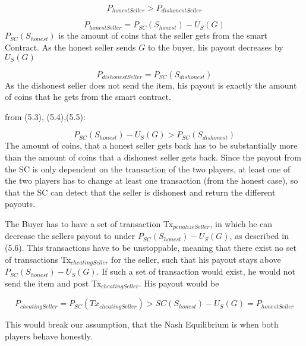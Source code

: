 \documentclass{cacthesis}
\begin{document}
\begin{equation}
    P_{honestSeller} > P_{dishonestSeller}
\end{equation}

\begin{equation}
    P_{honestSeller} = P_{SC}(S_{honest})- U_S(G)
\end{equation}
$P_{SC}(S_{honest})$ is the amount of coins that the seller gets from the smart Contract. As the honest seller sends $G$ to the buyer, his payout decreases by $U_S(G)$

\begin{equation}
    P_{dishonestSeller} = P_{SC}(S_{dishonest})
\end{equation}
As the dishonest seller does not send the item, his payout is exactly the amount of coins that he gets from the smart contract.

from (5.3), (5.4),(5.5):

\begin{equation}
   P_{SC}(S_{honest})- U_S(G) > P_{SC}(S_{dishonest})
\end{equation}
The amount of coins, that a honest seller gets back has to be substantially more than the amount of coins that a dishonest seller gets back.\newline
Since the payout from the SC is only dependent on the transaction of the two players, at least one of the two players has to change at least one transaction (from the honest case), so that the SC can detect that the seller is dishonest and return the different payouts.\newline

The Buyer has to have a set of transaction Tx$_{penalizeSeller}$, in which he can decrease the sellers payout to under $P_{SC}(S_{honest})- U_S(G)$, as described in (5.6).\newline
This transactions have to be unstoppable, meaning that there exist no set of transactions Tx$_{cheatingSeller}$ for the seller, such that his payout stays above $P_{SC}(S_{honest})- U_S(G)$. \newline 
If such a set of transaction would exist, he would not send the item and post Tx$_{cheatingSeller}$. His payout would be 

\[P_{cheatingSeller} = P_{SC}(Tx_{cheatingSeller}) > {SC}(S_{honest})- U_S(G) =  P_{honestSeller}\]

This would break our assumption, that the Nash Equilibrium is when both players behave honestly.\newline
\end{document}
